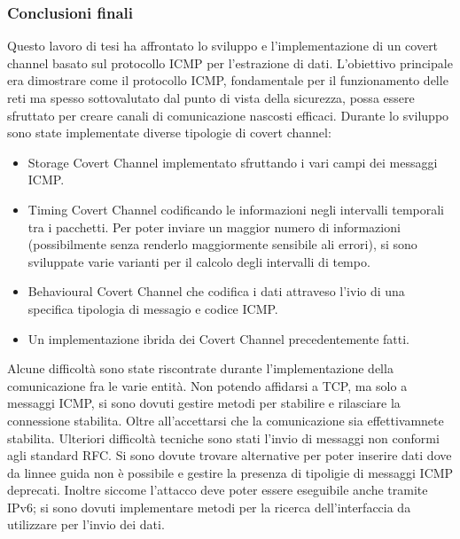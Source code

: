 \begin{frame}
\frametitle{Conclusioni finali}
Questo lavoro di tesi ha affrontato lo sviluppo e l'implementazione di un 
covert channel basato sul protocollo ICMP per l'estrazione di dati. 
L'obiettivo principale era dimostrare come il protocollo ICMP, fondamentale 
per il funzionamento delle reti ma spesso sottovalutato dal punto di vista 
della sicurezza, possa essere sfruttato per creare canali di comunicazione 
nascosti efficaci.
\vspace{3ex} \newline 
Durante lo sviluppo sono state implementate diverse tipologie di covert channel:
\begin{itemize}
    \item Storage Covert Channel implementato sfruttando i vari campi dei 
    messaggi ICMP. 
    \item Timing Covert Channel codificando le informazioni negli intervalli 
    temporali tra i pacchetti. Per poter inviare un maggior numero di informazioni 
    (possibilmente senza renderlo maggiormente sensibile ali errori), si sono 
    sviluppate varie varianti per il calcolo degli intervalli di tempo. 
    \item Behavioural Covert Channel che codifica i dati attraveso l'ivio di 
    una specifica tipologia di messagio e codice ICMP. 
    \item Un implementazione ibrida dei Covert Channel precedentemente fatti. 
\end{itemize}
\vspace{4ex}  
Alcune difficoltà sono state riscontrate durante l'implementazione della 
comunicazione fra le varie entità. Non potendo affidarsi a TCP, ma solo a 
messaggi ICMP, si sono dovuti gestire metodi per stabilire e rilasciare la 
connessione stabilita. Oltre all'accettarsi che la comunicazione sia 
effettivamnete stabilita.  
\vspace{4ex}  \newline 
Ulteriori difficoltà tecniche sono stati l'invio di messaggi non conformi 
agli standard RFC. Si sono dovute trovare alternative per poter inserire 
dati dove da linnee guida non è possibile e gestire la presenza di tipoligie 
di messaggi ICMP deprecati. Inoltre siccome l'attacco deve poter essere 
eseguibile anche tramite IPv6; si sono dovuti implementare metodi per la 
ricerca dell'interfaccia da utilizzare per l'invio dei dati. 
\end{frame} 

